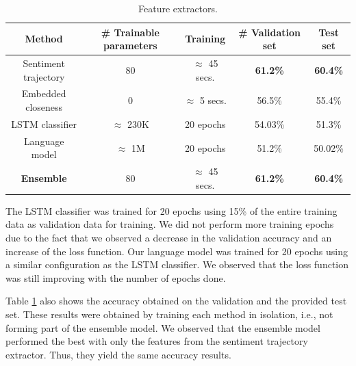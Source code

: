 \documentclass{article}
\newcommand{\lstm}{LSTM }
\begin{document}
\begin{table}[h!]
    \begin{center}
        \begin{tabular}{||c c c c c||} 
            \hline
            Method                 & \# Trainable parameters   & Training               & \# Validation set         & Test set \\ [0.5ex] 
            \hline\hline
            Sentiment trajectory   & 80                        & $ \approx $ 45 secs.   & \textbf{61.2\%}           & \textbf{60.4\%} \\ 
            \hline
            Embedded closeness     & 0                         & $ \approx $ 5 secs.    & 56.5\%                    & 55.4\% \\
            \hline
            LSTM classifier        & $ \approx $ 230K          & 20 epochs              & 54.03\%                   & 51.3\% \\ 
            \hline
            Language model         & $ \approx $ 1M            & 20 epochs              & 51.2\%                    & 50.02\% \\
            \hline
            \textbf{Ensemble}      & 80                        & $ \approx $ 45 secs.   & \textbf{61.2\%}           & \textbf{60.4\%} \\ [1ex] 
            \hline
        \end{tabular}    
    \end{center}
\caption{Feature extractors.}
\label{tab:params}
\end{table}
\vspace*{-0.5cm}

The \lstm classifier was trained for 20 epochs using 15\% of the entire training
data as validation data for training. We did not perform more training epochs
due to the fact that we observed a decrease in the validation accuracy and an
increase of the loss function.  Our language model was trained for 20 epochs
using a similar configuration as the \lstm classifier. We observed that the loss
function was still improving with the number of epochs done.


Table \ref{tab:params} also shows the accuracy obtained on
the validation and the provided test set. These results were obtained by
training each method in isolation, i.e., not forming part of the ensemble model.
We observed that the ensemble model performed the best with only the features
from the sentiment trajectory extractor. Thus, they
yield the same accuracy results.
\end{document}
